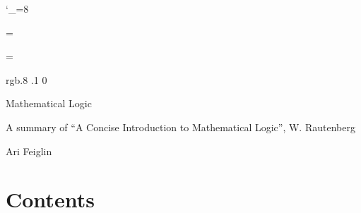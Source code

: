 \def\bnote{%
    \bppbox{rgb{1 1 .5}}{rgb{.5 .4 0}}{rgb{.5 .4 0}}
    \hbox to\hsize{\setfont{bf}Note\hfil}
    \medskip
}
\let\enote=\eppbox

\def\bexerc{%
    \bppbox{rgb{.9 1 .9}}{rgb{.3 .8 .3}}{rgb{.1 .65 .1}}
    \hbox to \hsize{\setfont{bf}Exercise\hfil}
    \def\curremphcolor{rgb{.1 .65 .1}}%
    \hrule height\z@%
    \medskip
}
\let\eexerc=\eppbox

\def\__refmath#1{\gotoanchor{#1}{\csname math@#1\endcsname}}
\def\_refmath[#1]#2{\gotoanchor{#2}{#1 \csname math@#2\endcsname}}
\def\refmath{\_ifnextchar[ {\_refmath}{\__refmath}}
\catcode`_=8


\def\qed{%
    \ifmmode \eqno\mathchar"404%
    \else%
        \hskip1cm\penalty0\null\nobreak\hfill$\mathchar"404$%
        \par\medskip%
    \fi%
}

%

\newcount\mlcount
\def\gentzen#1#2{%
    \,\vcenter{%
        \tabskip=.15cm\relax%
        \mlcount=1\relax%
        \offinterlineskip%
        \halign{\strut\hfil${##}$\hfil&&\global\advance\mlcount by 1\relax\vrule\kern.15cm${##}$\cr%
            #1\cr\noalign{\kern.1\jot\hrule\kern1\jot}%
            \multispan{\the\mlcount}\hfil$#2$\hfil\cr
        }%
    }\,%
}

\footline={}


\headline={}

\color rgb{.8 .1 0}

{\def\boxshadowcolor{rgb{.8 .8 0}}

    \centerline{Mathematical Logic}
    \smallskip
    \centerline{A summary of ``A Concise Introduction to Mathematical Logic'', W. Rautenberg}
    \centerline{Ari Feiglin}

\eppbox

\bigskip

\section*{Contents}

\tableofcontents
\eppbox

}


